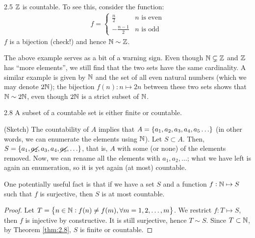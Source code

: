 \begin{example}{}{2.5}
    $\mathbb{Z}$ is countable. To see this, consider the function:
    \begin{align*}
        f = \begin{cases}
            \frac{n}{2} & \text{$n$ is even}
            \\ -\frac{n-1}{2} & \text{$n$ is odd}
            \end{cases}
    \end{align*}
    $f$ is a bijection (check!) and hence $\mathbb{N} \sim \mathbb{Z}$. 
\end{example}
\noindent The above example serves as a bit of a warning sign. Even though $\mathbb{N} \subsetneq \mathbb{Z}$ and $\mathbb{Z}$ has ``more elements'', we still find that the two sets have the same cardinality. A similar example is given by $\mathbb{N}$ and the set of all even natural numbers (which we may denote $2\mathbb{N}$); the bijection $f(n): n \mapsto 2n$ between these two sets shows that $\mathbb{N} \sim 2\mathbb{N}$, even though $2\mathbb{N}$ is a strict subset of $\mathbb{N}$. 
\setcounter{rudin}{7}

\begin{theorem}{}{2.8}
    A subset of a countable set is either finite or countable.
\end{theorem}
\begin{nproof}
    (Sketch) The countability of $A$ implies that $A = \set{a_1, a_2, a_3, a_4, a_5 \ldots}$ (in other words, we can enumerate the elements using $\mathbb{N}$). Let $S \subset A$. Then, $S = \set{a_1, \cancel{a_2}, a_3, a_4, \cancel{a_5}, \ldots}$, that is, $A$ with some (or none) of the elements removed. Now, we can rename all the elements with $a_1, a_2, \ldots$; what we have left is again an enumeration, so it is yet again (at most) countable.
\end{nproof}
\noindent One potentially useful fact is that if we have a set $S$ and a function $f: \mathbb{N} \mapsto S$ such that $f$ is surjective, then $S$ is at most countable. 

\begin{proof}
    Let $T = \set{n \in \mathbb{N}: f(n) \neq f(m), \forall m = 1, 2, \ldots, m}$. We restrict $f: T \mapsto S$, then $f$ is injective by constructive. It is still surjective, hence $T \sim S$. Since $T \subset \mathbb{N}$, by Theorem \ref{thm:2.8}, $S$ is finite or countable.
\end{proof}

\setcounter{rudin}{11}

